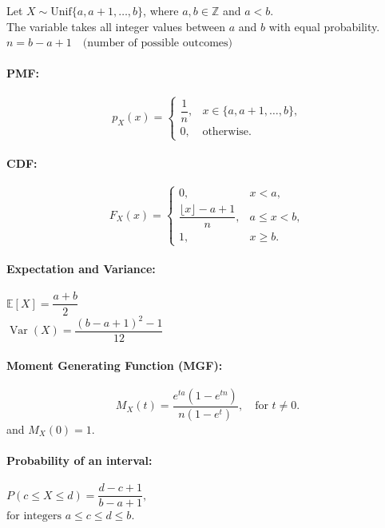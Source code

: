 Let $X \sim \text{Unif}\{a, a+1, \dots, b\}$, where $a,b \in \mathbb{Z}$ and $a < b$. \\
The variable takes all integer values between $a$ and $b$ with equal probability.\\

$n=b-a+1\quad\text{(number of possible outcomes)}$

\paragraph{PMF:}
\[
p_X(x) =
\begin{cases}
\dfrac{1}{n}, & x \in \{a, a+1, \dots, b\},\\
0, & \text{otherwise.}
\end{cases}
\]

\paragraph{CDF:}
\[
F_X(x) =
\begin{cases}
0, & x < a,\\
\dfrac{\lfloor x \rfloor - a + 1}{n}, & a \le x < b,\\
1, & x \ge b.
\end{cases}
\]

\paragraph{Expectation and Variance:}

$\mathbb{E}[X] = \dfrac{a + b}{2}$\\

$\operatorname{Var}(X) = \dfrac{(b - a + 1)^2 - 1}{12}$\\

\paragraph{Moment Generating Function (MGF):}
\[
M_X(t) = \dfrac{e^{ta} (1 - e^{tn})}{n(1 - e^t)}, \quad \text{for } t \neq 0.
\]
and \( M_X(0) = 1 \).

\paragraph{Probability of an interval:}
$P(c \le X \le d) = \dfrac{d - c + 1}{b - a + 1}, \quad$\\
$\text{for integers } a \le c \le d \le b.$\\

